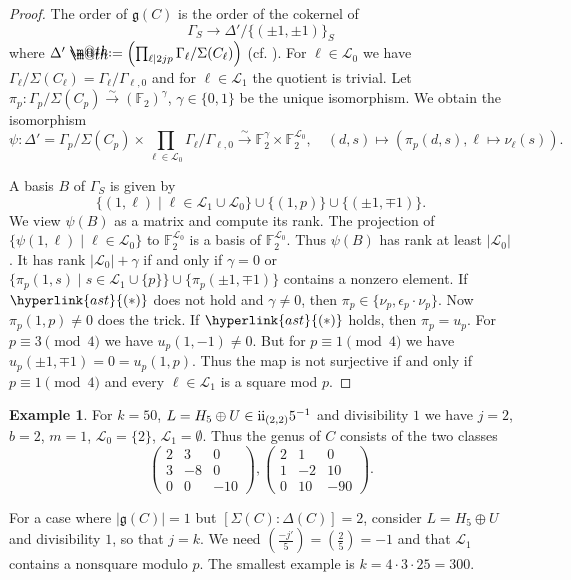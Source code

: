 \documentclass{amsart}
\makeatletter
\theoremstyle{definition}
\newtheorem{example}[definition]{Example}
\theoremstyle{plain}
\newcommand{\FF}{\mathbb{F}}
\newcommand{\RN}[1]{\textup{\uppercase\expandafter{\romannumeral#1}}}
\newcommand{\even}{\RN{2}}
\newcommand{\leg}[2]{\left( \frac{#1}{#2}\right)}
\newcommand*{\defeq}{\mathrel{\rlap{%
                     \raisebox{0.3ex}{$\m@th\cdot$}}%
                     \raisebox{-0.3ex}{$\m@th\cdot$}}%
                     =}
\newcommand{\condAst}{\hyperlink{ast}{(\ast)}}
\makeatother
\begin{document}
\begin{proof}
The order of $\mathfrak{g}(C)$ is the order of the cokernel of
\[\Gamma_S \rightarrow
\Delta' / \{(\pm 1, \pm 1)\}_S \]
where $\Delta'\defeq \left(\prod_{\ell \mid 2jp}  \Gamma_\ell / \Sigma(C_\ell)\right)$ (cf. \cite[VIII Prop. 6.1]{miranda_morrison:embeddings}).
For $\ell\in \mathcal{L}_0$ we have $\Gamma_\ell/\Sigma(C_\ell)=\Gamma_\ell/\Gamma_{\ell,0}$ and for $\ell \in \mathcal{L}_1$ the quotient is trivial.
Let $\pi_p\colon \Gamma_p / \Sigma(C_p) \xrightarrow{\sim} (\FF_2)^\gamma$, $\gamma \in \{0,1\}$ be the unique isomorphism.
We obtain the isomorphism
\[
\psi \colon \Delta' = \Gamma_p/\Sigma(C_p) \times
\prod_{\ell \in \mathcal{L}_0}  \Gamma_\ell / \Gamma_{\ell,0}
\xrightarrow{\sim} \FF_2^\gamma \times \FF_2^{\mathcal{L}_0}, \quad (d,s) \mapsto  (\pi_p(d,s),\ell\mapsto \nu_\ell(s)).\]

A basis $B$ of $\Gamma_S$ is given by
\[\{(1,\ell) \mid \ell \in {\mathcal{L}_1} \cup \mathcal{L}_0\}\cup \{(1,p)\} \cup \{(\pm 1,\mp 1)\}.\]
We view $\psi(B)$ as a matrix and compute its rank.
The projection of $\{\psi(1,\ell) \mid \ell\in \mathcal{L}_0\}$ to $\FF_2^{\mathcal{L}_0}$ is a basis of $\FF_2^{\mathcal{L}_0}$. Thus $\psi(B)$ has rank at least $|\mathcal{L}_0|$. It has rank $|\mathcal{L}_0| + \gamma$ if and only if $\gamma=0$ or $\{\pi_p(1,s) \mid s \in {\mathcal{L}_1} \cup \{p\}\}\cup \{\pi_p(\pm 1,\mp1)\}$ contains a nonzero element.
If $\condAst$ does not hold and $\gamma \neq 0$, then $\pi_p \in \{\nu_p,\epsilon_p\cdot \nu_p\}$. Now $\pi_p(1,p)\neq 0$ does the trick.
If $\condAst$ holds, then $\pi_p = u_p$.
For $p \equiv 3 \pmod 4$ we have $u_p(1,-1)\neq 0$.
But for $p \equiv 1 \pmod 4$ we have $u_p(\pm 1,\mp 1)= 0 =u_p(1,p)$.
Thus the map is not surjective if and only if $p\equiv 1 \pmod 4$ and  every $\ell \in {\mathcal{L}_1}$ is a square mod $p$.
\end{proof}
\begin{example}
 For $k=50$, $L = H_5 \oplus U \in \even_{(2,2)}5^{-1}$ and divisibility $1$ we have $j=2$, $b=2$, $m=1$, $\mathcal{L}_0=\{2\}$, $\mathcal{L}_1=\emptyset$.
 Thus the genus of $C$ consists of the two classes
 \[  \left(\begin{array}{rrr}
2 & 3 & 0 \\
3 & -8 & 0 \\
0 & 0 & -10
\end{array}\right), \left(\begin{array}{rrr}
2 & 1 & 0 \\
1 & -2 & 10 \\
0 & 10 & -90
\end{array}\right).\]

For a case where $|\mathfrak{g}(C)|=1$ but $[\Sigma(C) : \Delta(C)]=2$, consider
$L = H_5 \oplus U$ and divisibility $1$, so that $j = k$. We need $\leg{-j'}{5}=\leg{2}{5}=-1$ and that $\mathcal{L}_1$ contains a nonsquare modulo $p$. The smallest example is $k= 4 \cdot 3 \cdot 25 = 300$.
\end{example}
\end{document}

